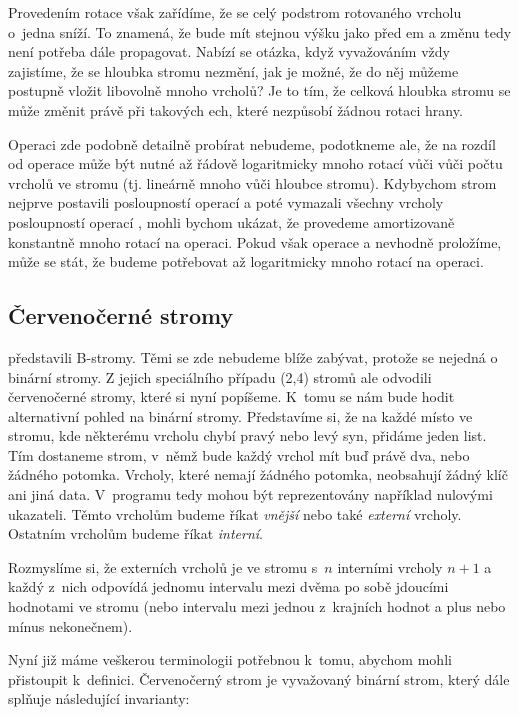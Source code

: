 Provedením rotace však zařídíme, že se celý podstrom rotovaného vrcholu o~jedna
sníží. To znamená, že bude mít stejnou výšku jako před em a změnu tedy
není potřeba dále propagovat. Nabízí se otázka, když vyvažováním vždy
zajistíme, že se hloubka stromu nezmění, jak je možné, že do něj můžeme
postupně vložit libovolně mnoho vrcholů? Je to tím, že celková hloubka stromu
se může změnit právě při takových ech, které nezpůsobí žádnou
rotaci hrany.

Operaci  zde podobně detailně probírat nebudeme, podotkneme ale, že na rozdíl od operace  může být nutné až řádově logaritmicky mnoho rotací vůči vůči počtu vrcholů ve stromu (tj. lineárně mnoho vůči hloubce stromu). Kdybychom strom nejprve postavili posloupností operací  a poté vymazali všechny vrcholy posloupností operací , mohli bychom ukázat, že provedeme amortizovaně konstantně mnoho rotací na operaci. Pokud však operace  a  nevhodně proložíme, může se stát, že budeme potřebovat až logaritmicky mnoho rotací na operaci.



\subsection{Červenočerné stromy}\label{sec:RB}

\citet{btrees} představili B-stromy. Těmi se zde nebudeme blíže zabývat, protože se nejedná o binární stromy. Z jejich speciálního případu (2,4) stromů ale \citet{redblack} odvodili červenočerné stromy, které si nyní popíšeme. K~tomu se nám bude hodit alternativní pohled na binární stromy.
Představíme si, že na každé místo ve stromu, kde některému vrcholu chybí pravý nebo levý syn, přidáme jeden list.
Tím dostaneme strom, v~němž bude každý vrchol mít buď právě dva, nebo
žádného potomka. Vrcholy, které nemají žádného potomka, neobsahují žádný klíč
ani jiná data. V~programu tedy mohou být reprezentovány například nulovými
ukazateli. Těmto vrcholům budeme říkat \emph{vnější} nebo také \emph{externí}
vrcholy. Ostatním vrcholům budeme říkat \emph{interní}.

Rozmyslíme si, že externích vrcholů je ve stromu s~$n$ 
interními vrcholy $n+1$ a každý z~nich odpovídá jednomu intervalu mezi dvěma po sobě
jdoucími hodnotami ve stromu (nebo intervalu mezi jednou z~krajních hodnot a
plus nebo mínus nekonečnem).

Nyní již máme veškerou terminologii potřebnou k~tomu, abychom mohli přistoupit k~definici. Červenočerný strom je vyvažovaný binární strom, který dále splňuje následující invarianty:

